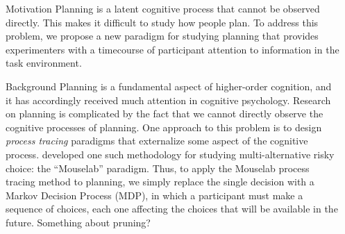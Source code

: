 \documentclass[final]{beamer}
\newlength{\sepwid}
\newlength{\onecolwid}
\begin{document}
\begin{frame}[t] %
\begin{columns}[t] %
\begin{column}{\sepwid}\end{column} %


\begin{column}{\onecolwid} %
  \begin{block}{Motivation}\label{Motivation}
    Planning is a latent cognitive process that cannot be observed directly. This makes it difficult to study how people plan.
    To address this problem, we propose a new paradigm for studying planning that provides experimenters with a timecourse of participant attention to information in the task environment. 
  \end{block}


  \begin{block}{Background}\label{Background}
    Planning is a fundamental aspect of higher-order cognition, and it has accordingly received much attention in cognitive psychology.
    Research on planning is complicated by the fact that we cannot directly observe the cognitive processes of planning.
    One approach to this problem is to design \emph{process tracing} paradigms that externalize some aspect of the cognitive process.  developed one such methodology for studying multi-alternative risky choice: the ``Mouselab'' paradigm.
    Thus, to apply the Mouselab process tracing method to planning, we simply replace the single decision with a Markov Decision Process (MDP), in which a participant must make a sequence of choices, each one affecting the choices that will be available in the future.
    Something about pruning?
  \end{block}


\end{column}
\end{columns}
\end{frame}
\end{document}
